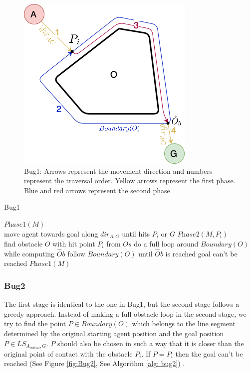 \begin{figure}[h!]
  \centering
  \includegraphics[scale=0.4]{images/Bug1.png}
  \caption{Bug1: Arrows represent the movement direction and numbers represent the traversal order. Yellow arrows represent the first phase. Blue and red arrows represent the second phase}
  \label{fig:Bug1}
\end{figure}

\begin{algorithm}
\caption{Bug1}
\label{alg: bug1}
\begin{algorithmic}[1]
    \State $\textit{Phase1}(M)$
\EndProcedure
\\
    \State move agent towards goal along $dir_{A, G}$ until hits $P_i$ or $G$
        \State \Return
    \EndIf
    \State $\textit{Phase2}(M, P_i)$
\EndProcedure
\\
    \State find obstacle $O$ with hit point $P_i$ from $Os$
    \State do a full loop around $Boundary(O)$ while computing $\hat{O}b$
    \State follow $Boundary(O)$ until $\hat{O}b$ is reached
    \State
        \State goal can't be reached
        \State \Return
    \EndIf
    \State
    \State $\textit{Phase1}(M)$
\EndProcedure
\end{algorithmic}
\end{algorithm}

\subsubsection{Bug2} \label{sec: bug2}
The first stage is identical to the one in Bug1, but the second stage follows a greedy approach. Instead of making a full obstacle loop in the second stage, we try to find the point $P \in Boundary(O)$ which belongs to the line segment determined by the original starting agent position and the goal position $P \in LS_{A_{initial}, G}$. $P$ should also be chosen in such a way that it is closer than the original point of contact with the obstacle $P_i$. If $P = P_i$ then the goal can't be reached (See Figure \ref{fig:Bug2}, See Algorithm \ref{alg: bug2}) \cite{lumelsky1986dynamic}.

